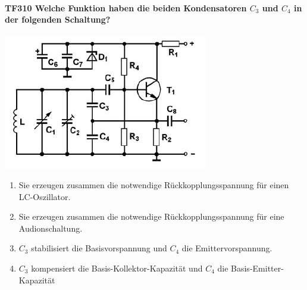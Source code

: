 \documentclass[8pt]{article}
\begin{document}
\paragraph*{TF310 Welche Funktion haben die beiden Kondensatoren $C_{3}$ und $C_{4}$ in der folgenden Schaltung?}
\begin{center}
	\begin{minipage}{\linewidth}
		\centering
		\includegraphics[scale=1.0]{pics/tf310_a.jpg}
	\end{minipage}
\end{center}
\begin{enumerate}[nolistsep,label=\Alph*]
\item Sie erzeugen zusammen die notwendige Rückkopplungsspannung für einen LC-Oszillator.
\item Sie erzeugen zusammen die notwendige Rückkopplungsspannung für eine Audionschaltung.
\item $C_{3}$ stabilisiert die Basisvorspannung und $C_{4}$ die Emittervorspannung.
\item $C_{3}$ kompensiert die Basis-Kollektor-Kapazität und $C_{4}$ die Basis-Emitter-Kapazität
\end{enumerate}
\end{document}
